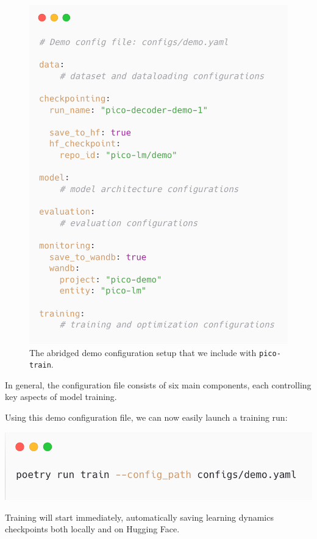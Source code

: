 \begin{figure}[h!] 
    \centering
    \includegraphics[width=0.7\columnwidth]{chapters/pico/figures/demo/demo_config.png}
    \caption{The abridged demo configuration setup that we include with \texttt{pico-train}.}
    \label{fig:demo_config}
\end{figure}

In general, the configuration file consists of six main components, each controlling key aspects of model training. 

Using this demo configuration file, we can now easily launch a training run:

\begin{center}
    \includegraphics[width=0.7\columnwidth]{chapters/pico/figures/demo/demo_run.png}
\end{center}

Training will start immediately, automatically saving learning dynamics checkpoints both locally and on Hugging Face.



